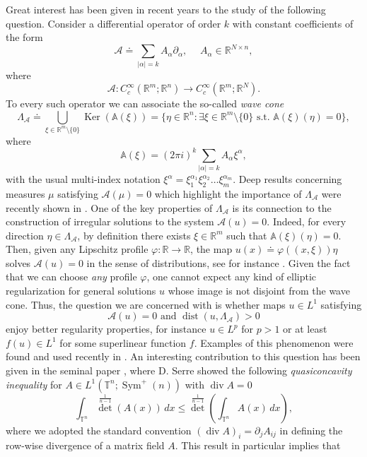 \documentclass[10pt,reqno]{amsart}
\numberwithin{equation}{section}
\newcommand{\A}{\mathcal{A}}
\newcommand{\R}{\mathbb{R}}
\newcommand{\T}{\mathbb{T}}
\DeclareMathOperator{\Ker}{Ker}
\DeclareMathOperator{\dv}{div}
\DeclareMathOperator{\Sym}{Sym}
\DeclareMathOperator{\dist}{dist}
\theoremstyle{plain}
\theoremstyle{definition}
\theoremstyle{remark}
\begin{document}
Great interest has been given in recent years to the study of the following question. Consider a differential operator of order $k$ with constant coefficients of the form
\[
\mathcal{A} \doteq \sum_{|\alpha|= k} A_{\alpha}\partial_\alpha,\quad  \; A_\alpha \in \R^{N \times n},
\]
where
\[
\mathcal{A} : C^\infty_c(\R^m;\R^n) \to C^\infty_c(\R^m;\R^N).
\]
To every such operator we can associate the so-called \emph{wave cone}
\[
\Lambda_{\A} \doteq  \bigcup_{\xi \in \R^m\setminus\{0\}}\Ker(\mathbb{A}(\xi)) =  \{\eta \in \R^n: \exists \xi \in \R^m\setminus\{0\} \text{ s.t. } \mathbb{A} (\xi)(\eta) = 0\},
\]
where 
$$
\mathbb{A}(\xi)=(2\pi i)^k\sum_{|\alpha|=k} A_\alpha \xi^\alpha,
$$
with the usual multi-index notation $\xi^\alpha=\xi_1^{\alpha_1}\xi_2^{\alpha_2}\dots \xi_m^{\alpha_m}$. Deep results concerning measures $\mu$ satisfying $\A(\mu) = 0$ which highlight the importance of $\Lambda_\A$  were recently shown in \cite{GUIANN, RDHR}.  One of the key properties of $\Lambda_\A$ is its connection to the construction of irregular solutions to the system $\A(u) = 0$. Indeed, for every direction $\eta\in \Lambda_{\mathcal A}$, by definition there exists $\xi \in \R^m$ such that $\mathbb{A}(\xi)(\eta) = 0$. Then, given any Lipschitz profile $\varphi : \R \to \R$, the map $u(x) \doteq \varphi((x,\xi))\eta$ solves $\mathcal{A}(u) = 0$ in the sense of distributions, see for instance \cite[Sec. 4]{ST}.  Given the fact that we can choose \emph{any} profile $\varphi$, one cannot expect any kind of elliptic regularization for general solutions $u$ whose image is not disjoint from the wave cone. Thus, the question we are concerned with is whether maps $u \in L^1$ satisfying
\begin{equation}\label{distcone}
\A(u) = 0 \text{ and }\dist(u,\Lambda_\A) > 0
\end{equation}
enjoy better regularity properties, for instance $u \in L^{p}$ for $p > 1$ or at least $f(u) \in L^1$ for some superlinear function $f$. Examples of this phenomenon were found and used recently in \cite{HIGHER, GRS, CT}.  An interesting contribution to this question has been given in the seminal paper \cite{SER}, where D. Serre showed the following \emph{quasiconcavity inequality} for $A \in L^1(\T^n;\Sym^+(n))$ with $\dv A = 0$
 \begin{equation}\label{impineq}
\int_{\T^n}{\det}^\frac{1}{n-1}(A(x))\,dx \le {\det}^\frac{1}{n-1}\left(\int_{\T^n}A(x)\,dx\right),
\end{equation}
where we adopted the standard convention $(\dv A)_i=\partial_j A_{ij}$ in defining the row-wise divergence of a matrix field $A$. This result in particular implies that
\end{document}
